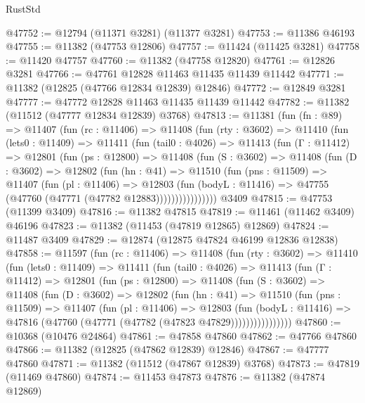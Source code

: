 \begin{lexlean}{RustStd}
\begin{coremodule}
@47752 := @12794 (@11371 @3281) (@11377 @3281)
@47753 := @11386 @46193
@47755 := @11382 (@47753 @12806)
@47757 := @11424 (@11425 @3281)
@47758 := @11420 @47757
@47760 := @11382 (@47758 @12820)
@47761 := @12826 @3281
@47766 := @47761 @12828 @11463 @11435 @11439 @11442
@47771 := @11382 (@12825 (@47766 @12834 @12839) @12846)
@47772 := @12849 @3281
@47777 := @47772 @12828 @11463 @11435 @11439 @11442
@47782 := @11382 (@11512 (@47777 @12834 @12839) @3768)
@47813 := @11381
    (fun (fn : @89) =>
    @11407
      (fun (rc : @11406) =>
      @11408
        (fun (rty : @3602) =>
        @11410
          (fun (lets0 : @11409) =>
          @11411
            (fun (tail0 : @4026) =>
            @11413
              (fun (Γ : @11412) =>
              @12801
                (fun (ps : @12800) =>
                @11408
                  (fun (S : @3602) =>
                  @11408
                    (fun (D : @3602) =>
                    @12802
                      (fun (hn : @41) =>
                      @11510
                        (fun (pns : @11509) =>
                        @11407
                          (fun (pl : @11406) =>
                          @12803
                            (fun (bodyL : @11416) =>
                            @47755 (@47760 (@47771 (@47782 @12883))))))))))))))))
    @3409
@47815 := @47753 (@11399 @3409)
@47816 := @11382 @47815
@47819 := @11461 (@11462 @3409) @46196
@47823 := @11382 (@11453 (@47819 @12865) @12869)
@47824 := @11487 @3409
@47829 := @12874 (@12875 @47824 @46199 @12836 @12838)
@47858 := @11597
    (fun (rc : @11406) =>
    @11408
      (fun (rty : @3602) =>
      @11410
        (fun (lets0 : @11409) =>
        @11411
          (fun (tail0 : @4026) =>
          @11413
            (fun (Γ : @11412) =>
            @12801
              (fun (ps : @12800) =>
              @11408
                (fun (S : @3602) =>
                @11408
                  (fun (D : @3602) =>
                  @12802
                    (fun (hn : @41) =>
                    @11510
                      (fun (pns : @11509) =>
                      @11407
                        (fun (pl : @11406) =>
                        @12803
                          (fun (bodyL : @11416) =>
                          @47816 (@47760 (@47771 (@47782 (@47823 @47829))))))))))))))))
@47860 := @10368 (@10476 @24864)
@47861 := @47858 @47860
@47862 := @47766 @47860
@47866 := @11382 (@12825 (@47862 @12839) @12846)
@47867 := @47777 @47860
@47871 := @11382 (@11512 (@47867 @12839) @3768)
@47873 := @47819 (@11469 @47860)
@47874 := @11453 @47873
@47876 := @11382 (@47874 @12869)

\end{coremodule}
\end{lexlean}
